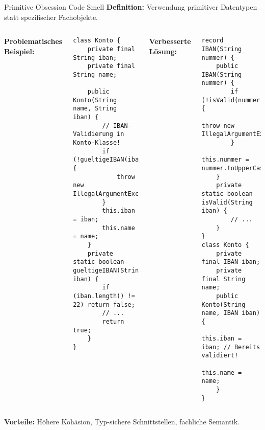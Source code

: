 \begin{frame}[fragile]{Primitive Obsession Code Smell}
  \textbf{Definition:} Verwendung primitiver Datentypen statt spezifischer Fachobjekte.
  \begin{columns}[T]
    \textbf{Problematisches Beispiel:}
    \begin{lstlisting}[style=java, basicstyle=\tiny\ttfamily]
class Konto {
    private final String iban;
    private final String name;

    public Konto(String name, String iban) {
        // IBAN-Validierung in Konto-Klasse!
        if (!gueltigeIBAN(iban)) {
            throw new IllegalArgumentException();
        }
        this.iban = iban;
        this.name = name;
    }
    private static boolean gueltigeIBAN(String iban) {
        if (iban.length() != 22) return false;
        // ...
        return true;
    }
}
    \end{lstlisting}
    \textbf{Verbesserte Lösung:}
    \begin{lstlisting}[style=java, basicstyle=\tiny\ttfamily]
record IBAN(String nummer) {
    public IBAN(String nummer) {
        if (!isValid(nummer)) {
            throw new IllegalArgumentException();
        }
        this.nummer = nummer.toUpperCase();
    }
    private static boolean isValid(String iban) {
        // ...
    }
}
class Konto {
    private final IBAN iban;
    private final String name;
    public Konto(String name, IBAN iban) {
        this.iban = iban; // Bereits validiert!
        this.name = name;
    }
}
    \end{lstlisting}
  \end{columns}
  \textbf{Vorteile:} Höhere Kohäsion, Typ-sichere Schnittstellen, fachliche Semantik.
\end{frame}

